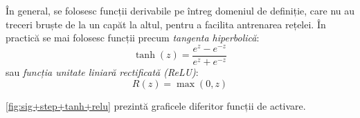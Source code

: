 În general, se folosesc funcții derivabile pe întreg domeniul de definiție, care nu au treceri bruște de la un capăt la altul, pentru a facilita antrenarea rețelei. În practică se mai folosesc funcții precum \textit{tangenta hiperbolică}:
\begin{equation}
\tanh(z)=\frac{e^z - e^{-z}}{e^z + e^{-z}}
\end{equation}
sau \textit{funcția unitate liniară rectificată (ReLU)}:
\begin{equation}
R(z)=\max(0,z)
\label{eq:relu}
\end{equation}

\autoref{fig:sig+step+tanh+relu} prezintă graficele diferitor funcții de activare.
\begin{figure}[ht]
\centering
{}
\qquad
{}
\qquad
{}

\end{figure}
